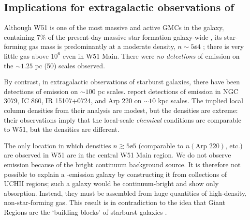 \subsection{Implications for extragalactic observations of \formaldehyde}
\label{sec:exgal}
Although W51 is one of the most massive and active GMCs in the galaxy,
containing 7\% of the present-day massive star formation galaxy-wide
\citep{Urquhart2014a}, its star-forming gas mass is predominantly at a moderate
density, $n\sim5\ee{4}$ \percc; there is very little gas above $10^6$ \percc even
in W51 Main.  There were \emph{no detections} of \formaldehyde emission on the
$\sim1.25$ pc (50\arcsec) scales observed.  


By contrast, in extragalactic observations of starburst galaxies, there have
been detections of \formaldehyde emission on $\sim100$ pc scales.
\citet{Mangum2013a} report
detections of \formaldehyde \oneone emission in NGC 3079, IC 860, IR
15107+0724, and Arp 220 on $\sim10$ kpc scales.  The implied local column
densities from their analysis are modest, but the densities are extreme: their
observations imply that the local-scale \emph{chemical} conditions are
comparable to W51, but the densities are different.

The only location in which densities $n\gtrsim5\ee{5}$ \percc (comparable to
$n(\textrm{Arp } 220)$, etc.) are observed in W51 are in the central W51
Main region.  We do not observe emission because of the bright
continuum background source.  It is therefore not possible to explain a
\formaldehyde-emission galaxy by constructing it from collections of UCHII
regions; such a galaxy would be continuum-bright and show only \formaldehyde
absorption.  Instead, they must be assembled from huge quantities of
high-density, non-star-forming gas.  This result is in contradiction to the
idea that Giant \hii Regions are the `building blocks' of starburst galaxies
\citep[e.g.][]{Miura2014a}.

